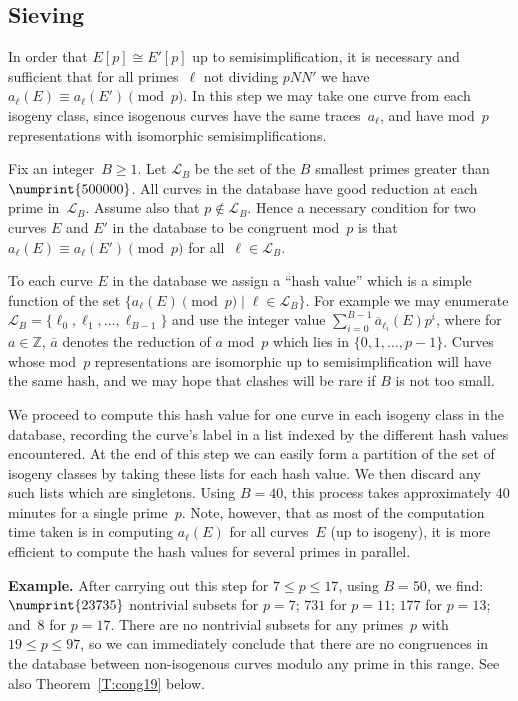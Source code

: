 \documentclass[twoside,leqno,symbols-for-thanks, draft]{rmi}
\numberwithin{equation}{section}
\newcommand{\Z}{\mathbb{Z}}
\newcommand{\calL}{\mathcal{L}}
\theoremstyle{remark}
\begin{document}
\subsection{Sieving}
In order that $E[p]\cong E'[p]$ up to semisimplification, it is
necessary and sufficient that for all primes~$\ell$ not dividing
$pNN'$ we have $a_{\ell}(E)\equiv a_{\ell}(E')\pmod{p}$.  In this step
we may take one curve from each isogeny class, since isogenous curves
have the same traces~$a_\ell$, and have mod~$p$ representations with
isomorphic semisimplifications.

Fix an integer~$B\ge1$.  Let $\calL_B$ be the set of the $B$ smallest
primes greater than $\numprint{500000}$. All curves in the database
have good reduction at each prime in~$\calL_B$.  Assume also that
$p\notin\calL_B$. Hence a necessary condition for
two curves $E$ and $E'$ in the database to be congruent mod~$p$ is
that $a_{\ell}(E)\equiv a_{\ell}(E')\pmod{p}$ for all~$\ell\in\calL_B$.

To each curve $E$ in the database we assign a ``hash value'' which is
a simple function of the set $\{a_{\ell}(E)\pmod{p}\mid
\ell\in\calL_B\}$.  For example we may enumerate
$\calL_B=\{\ell_0,\ell_1,\dots,\ell_{B-1}\}$ and use the integer value
$\sum_{i=0}^{B-1}\overline{a}_{\ell_i}(E)p^i$, where for $a\in\Z$,
$\overline{a}$ denotes the reduction of $a$ mod~$p$ which lies in
$\{0,1,\dots,p-1\}$.  Curves whose mod~$p$ representations are
isomorphic up to semisimplification will have the same hash, and we
may hope that clashes will be rare if $B$ is not too small.

We proceed to compute this hash value for one curve in each isogeny
class in the database, recording the curve's label in a list indexed
by the different hash values encountered.  At the end of this step we
can easily form a partition of the set of isogeny classes by taking
these lists for each hash value.  We then discard any such lists which
are singletons.  Using $B=40$, this process takes approximately 40
minutes for a single prime~$p$.  Note, however, that as most of the
computation time taken is in computing $a_{\ell}(E)$ for all
curves~$E$ (up to isogeny), it is more efficient to compute the hash
values for several primes in parallel.

{\bf Example.} After carrying out this step for $7\le p\le17$, using
$B=50$, we find: $\numprint{23735}$ nontrivial subsets for $p=7$;
$731$ for $p=11$; $177$ for $p=13$; and~$8$ for $p=17$.  There are no
nontrivial subsets for any primes~$p$ with $19\le p\le97$, so we can
immediately conclude that there are no congruences in the database
between non-isogenous curves modulo any prime in this range.  See also
Theorem~\ref{T:cong19} below.
\end{document}
